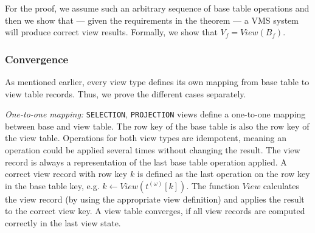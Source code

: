 For the proof, we assume such an arbitrary sequence of base table operations
 and then we show that --- given the requirements in the theorem --- a VMS 
 system will produce correct view results. Formally, we show that $V_f=View(B_f)$. 

\subsubsection{Convergence}
\label{sub:proof_convergence}
As mentioned earlier, every view type defines its own mapping from base table 
to view table records. Thus, we prove the different cases separately. 

\noindent
\textit{One-to-one mapping:} \texttt{SELECTION}, \texttt{PROJECTION} 
views define a one-to-one mapping between base and view table. The row 
key of the base table is also the row key of the view table. Operations 
for both view types are idempotent, meaning an operation could be 
applied several times without changing the result. The view record is 
always a representation of the last base table operation applied. A 
correct view record with row key $k$ is defined as the last operation on 
the row key in the base table key, e.g. $k\leftarrow 
View(t^{(\omega)}[k])$. The function $View$ calculates the view record 
(by using the appropriate view definition) and applies the result to the 
correct view key. A view table converges, if all view records are 
computed correctly in the last view state. 

